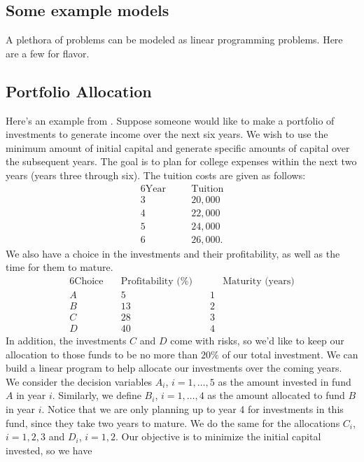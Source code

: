 \documentclass[12pt,english]{article}
\begin{document}
\subsection{Some example models}

A plethora of problems can be modeled as linear programming problems.  Here are a few for flavor. 

\subsection*{Portfolio Allocation} 

Here's an example from \cite{PoMuDi:2014}.  Suppose someone would like to make a portfolio of investments to generate income over the next six years.   We wish to use the minimum amount of initial capital and generate specific amounts of capital over the subsequent years.   The goal is to plan for college expenses within the next two years (years three through six).  The tuition costs are given as follows:
\begin{alignat*}{6} 
\text{Year} \quad	&&\text{Tuition} \\
3		\quad 	&& 20,000\\
4 		\quad	&& 22,000\\
5		\quad	&& 24,000\\
6		\quad	&& 26,000.
\end{alignat*}
We also have a choice in the investments and their profitability, as well as the time for them to mature.
\begin{alignat*}{6}
\text{Choice}	\quad	& \text{Profitability (\%)}	\quad 	&& \text{Maturity (years)} \\
A			\quad	&	5				\quad	&		1 \\
B			\quad 	&	13				\quad 	&		2 \\
C			\quad	&	28				\quad	&		3 \\
D			\quad	&	40				\quad 	&		4
\end{alignat*}
In addition, the investments $C$ and $D$ come with risks, so we'd like to keep our allocation to those funds to be no more than $20\%$ of our total investment.  We can build a linear program to help allocate our investments over the coming years.  We consider the decision variables $A_i$, $i=1,\dots,5$ as the amount invested in fund $A$ in year $i$.  Similarly, we define $B_i$, $i=1,\dots,4$ as the amount allocated to fund $B$ in year $i$.  Notice that we are only planning up to year 4 for investments in this fund, since they take two years to mature.  We do the same for the allocations $C_i$, $i=1,2,3$ and $D_i$, $i=1,2$.  Our objective is to minimize the initial capital invested, so we have
\end{document}

